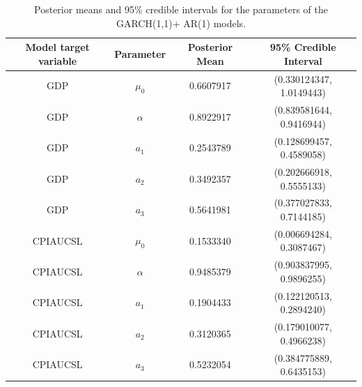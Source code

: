 \begin{table}[H]
    \centering
    \begin{tabular}{|c|c|c|c|}
        \hline
        \textbf{Model target variable } & \textbf{Parameter } & \textbf{Posterior Mean } & \textbf{95\% Credible Interval } \\
        \hline
        GDP      & $\mu_0$  & 0.6607917 & (0.330124347, 1.0149443) \\
        GDP      & $\alpha$ & 0.8922917 & (0.839581644, 0.9416944) \\
        GDP      & $a_1$    & 0.2543789 & (0.128699457, 0.4589058) \\
        GDP      & $a_2$    & 0.3492357 & (0.202666918, 0.5555133) \\
        GDP      & $a_3$    & 0.5641981 & (0.377027833, 0.7144185) \\
        CPIAUCSL & $\mu_0$  & 0.1533340 & (0.006694284, 0.3087467) \\
        CPIAUCSL & $\alpha$ & 0.9485379 & (0.903837995, 0.9896255) \\
        CPIAUCSL & $a_1$    & 0.1904433 & (0.122120513, 0.2894240) \\
        CPIAUCSL & $a_2$    & 0.3120365 & (0.179010077, 0.4966238) \\
        CPIAUCSL & $a_3$    & 0.5232054 & (0.384775889, 0.6435153) \\
        \hline
    \end{tabular}
    \caption{Posterior means and 95\% credible intervals for the parameters of the GARCH(1,1)+ AR(1) models.}
    \label{tab:GARCH1,1_AR1_posteriors}
\end{table}